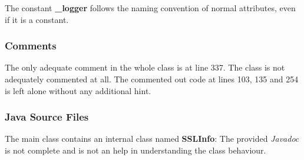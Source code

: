 \begin{itemize}
		The constant \textbf{\_logger} follows the naming convention of normal attributes, even if it is a constant.
\end{itemize}

\subsubsection{Comments}
\begin{itemize}
		The only adequate comment in the whole class is at line 337.
		The class is not adequately commented at all.
		The commented out code at lines 103, 135 and 254 is left alone without any additional hint.
\end{itemize}

\subsubsection{Java Source Files}
\begin{itemize}
		The main class contains an internal class named \textbf{SSLInfo}:
	The provided \textit{Javadoc} is not complete and is not an help in understanding the class behaviour.
\end{itemize}


